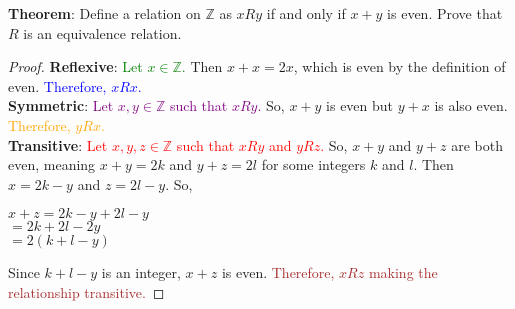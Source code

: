 \documentclass[11pt, oneside]{article}
\begin{document}
\noindent \textbf{Theorem}:   Define a relation on $\mathbb{Z}$ as $xRy$ if and only if $x+y$ is even. Prove that $R$ is an equivalence relation.
\begin{proof}
\textbf{Reflexive}: \textcolor{green}{Let $x\in \mathbb{Z}$.} Then $x+x=2x$, which is even by the definition of even. \textcolor{blue}{Therefore, $xRx$.}\\
\textbf{Symmetric}: \textcolor{purple}{ Let $x,y\in \mathbb{Z}$ such that $xRy$.} So, $x+y$ is even but $y+x$ is also even. \textcolor{orange}{Therefore, $yRx$.} \\
\textbf{Transitive}: \textcolor{red}{Let $x,y,z\in \mathbb{Z}$ such that $xRy$ and $yRz$.} So, $x+y$ and $y+z$ are both even, meaning $x+y=2k$ and $y+z=2l$ for some integers $k$ and $l$. Then $x=2k-y$ and $z=2l-y$. So,
\begin{center}
    $x+z=2k-y+2l-y$\\
    $=2k+2l-2y$\\
    $=2(k+l-y)$
\end{center}
Since $k+l-y$ is an integer, $x+z$ is even. \textcolor{brown}{Therefore, $xRz$ making the relationship transitive.}
\end{proof}


		 \newpage    


	 
  
  	
		\newpage
\end{document}
